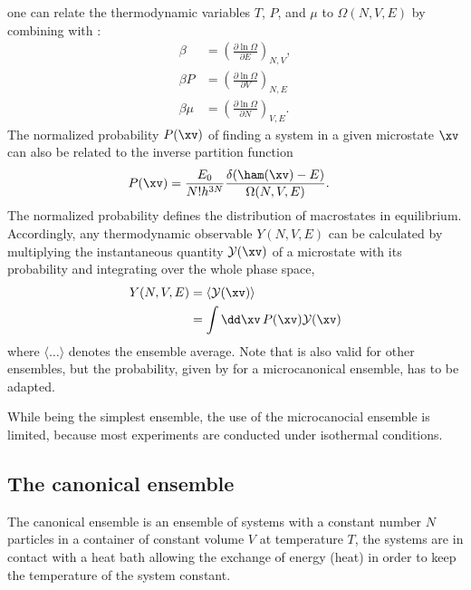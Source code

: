 %
one can relate the thermodynamic variables $T$, $P$, and $\mu$ to $\Omega(N,V,E)$ by combining  with :
%
\begin{align}
\beta&=\left ( \frac{\partial \ln \Omega}{\partial E} \right ) _{N,V}, \nonumber \\
\beta P&=\left ( \frac{\partial \ln \Omega}{\partial V} \right ) _{N,E} \nonumber \\
\beta \mu&=\left ( \frac{\partial \ln \Omega}{\partial N} \right ) _{V,E}.
\end{align}
%
The normalized probability $P(\xv)$ of finding a system in a given microstate $\xv$ can also be related to the inverse partition function
%
\begin{align}
    P(\xv) &= \frac{E_0}{N!h^{3N}}\frac{\delta(\ham(\xv)-E)}{\Omega(N,V,E)} . \label{eq:microprob}
\end{align}
%
The normalized probability defines the distribution of macrostates in equilibrium. Accordingly, any thermodynamic observable $Y(N,V,E)$ can be calculated by multiplying the instantaneous quantity $\mathcal{Y(\xv)}$ of a microstate with its probability and integrating over the whole phase space, \ie
%
\begin{align}
    Y(N,V,E)&=\langle \mathcal{Y}(\xv) \rangle \nonumber \\
     &=\int \dd \xv \, P(\xv) \mathcal{Y}(\xv) \label{eq:property}
\end{align}
%
where $\langle \dots \rangle$ denotes the ensemble average. Note that 
 is also 
valid for other ensembles, but the probability, given by  for a microcanonical
ensemble, has to be adapted.

While being the simplest ensemble, the use of the microcanocial ensemble is limited, because most experiments are conducted under isothermal conditions.
%


%
\subsection{The canonical ensemble}
%
The canonical ensemble is an ensemble 
of systems
with a constant
number $N$ particles in a container of constant volume $V$ at
temperature $T$, \ie{} the systems are in contact with a heat bath
allowing the exchange of energy (heat) in order to keep the temperature of
the system constant.
%

